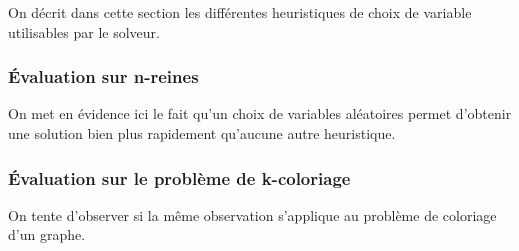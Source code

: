 \documentclass[14pt]{article}
\begin{document}
On décrit dans cette section les différentes heuristiques de choix de variable utilisables par le solveur.

\subsubsection{Évaluation sur n-reines}

On met en évidence ici le fait qu'un choix de variables aléatoires permet d'obtenir une solution bien plus rapidement qu'aucune autre heuristique.

\subsubsection{Évaluation sur le problème de k-coloriage}

On tente d'observer si la même observation s'applique au problème de coloriage d'un graphe.

\end{document}
